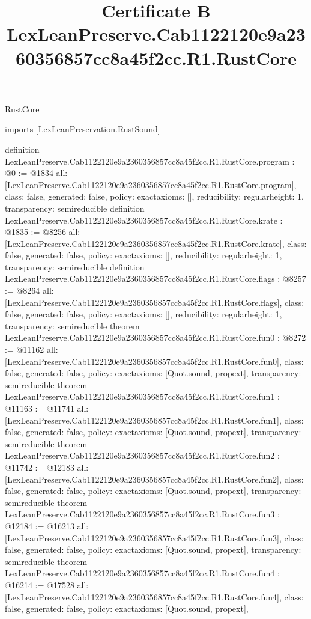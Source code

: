 \begin{lexlean}{RustCore}
\title{Certificate B LexLeanPreserve.Cab1122120e9a2360356857cc8a45f2cc.R1.RustCore}
\begin{coremodule}
imports [LexLeanPreservation.RustSound]

definition LexLeanPreserve.Cab1122120e9a2360356857cc8a45f2cc.R1.RustCore.program : @0 := @1834 {
  all: [LexLeanPreserve.Cab1122120e9a2360356857cc8a45f2cc.R1.RustCore.program],
  class: false,
  generated: false,
  policy: exact{axioms: []},
  reducibility: regular{height: 1},
  transparency: semireducible
}
definition LexLeanPreserve.Cab1122120e9a2360356857cc8a45f2cc.R1.RustCore.krate : @1835 := @8256 {
  all: [LexLeanPreserve.Cab1122120e9a2360356857cc8a45f2cc.R1.RustCore.krate],
  class: false,
  generated: false,
  policy: exact{axioms: []},
  reducibility: regular{height: 1},
  transparency: semireducible
}
definition LexLeanPreserve.Cab1122120e9a2360356857cc8a45f2cc.R1.RustCore.flags : @8257 := @8264 {
  all: [LexLeanPreserve.Cab1122120e9a2360356857cc8a45f2cc.R1.RustCore.flags],
  class: false,
  generated: false,
  policy: exact{axioms: []},
  reducibility: regular{height: 1},
  transparency: semireducible
}
theorem LexLeanPreserve.Cab1122120e9a2360356857cc8a45f2cc.R1.RustCore.fun0 : @8272 := @11162 {
  all: [LexLeanPreserve.Cab1122120e9a2360356857cc8a45f2cc.R1.RustCore.fun0],
  class: false,
  generated: false,
  policy: exact{axioms: [Quot.sound, propext]},
  transparency: semireducible
}
theorem LexLeanPreserve.Cab1122120e9a2360356857cc8a45f2cc.R1.RustCore.fun1 : @11163 := @11741 {
  all: [LexLeanPreserve.Cab1122120e9a2360356857cc8a45f2cc.R1.RustCore.fun1],
  class: false,
  generated: false,
  policy: exact{axioms: [Quot.sound, propext]},
  transparency: semireducible
}
theorem LexLeanPreserve.Cab1122120e9a2360356857cc8a45f2cc.R1.RustCore.fun2 : @11742 := @12183 {
  all: [LexLeanPreserve.Cab1122120e9a2360356857cc8a45f2cc.R1.RustCore.fun2],
  class: false,
  generated: false,
  policy: exact{axioms: [Quot.sound, propext]},
  transparency: semireducible
}
theorem LexLeanPreserve.Cab1122120e9a2360356857cc8a45f2cc.R1.RustCore.fun3 : @12184 := @16213 {
  all: [LexLeanPreserve.Cab1122120e9a2360356857cc8a45f2cc.R1.RustCore.fun3],
  class: false,
  generated: false,
  policy: exact{axioms: [Quot.sound, propext]},
  transparency: semireducible
}
theorem LexLeanPreserve.Cab1122120e9a2360356857cc8a45f2cc.R1.RustCore.fun4 : @16214 := @17528 {
  all: [LexLeanPreserve.Cab1122120e9a2360356857cc8a45f2cc.R1.RustCore.fun4],
  class: false,
  generated: false,
  policy: exact{axioms: [Quot.sound, propext]},
}
\end{coremodule}
\end{lexlean}
